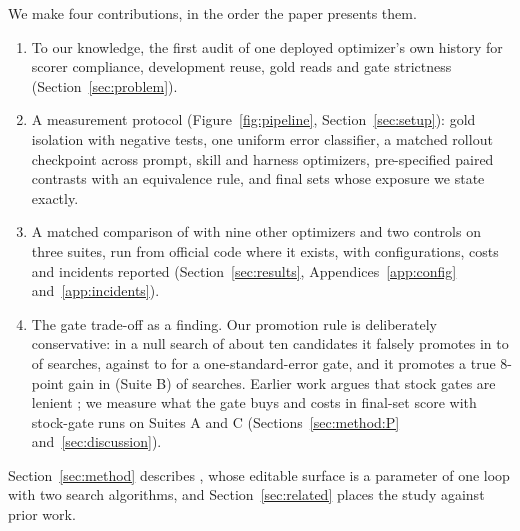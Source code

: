 We make four contributions, in the order the paper presents them.
\begin{enumerate}[leftmargin=*,nosep]
\item To our knowledge, the first audit of one deployed optimizer's own history for scorer compliance, development reuse, gold reads and gate strictness (Section~\ref{sec:problem}).
\item A measurement protocol (Figure~\ref{fig:pipeline}, Section~\ref{sec:setup}): gold isolation with negative tests, one uniform error classifier, a matched rollout checkpoint across prompt, skill and harness optimizers, pre-specified paired contrasts with an equivalence rule, and final sets whose exposure we state exactly.
\item A matched comparison of \capevolve{} with nine other optimizers and two controls on three suites, run from official code where it exists, with configurations, costs and incidents reported (Section~\ref{sec:results}, Appendices~\ref{app:config} and~\ref{app:incidents}). 
\item The gate trade-off as a finding. Our promotion rule is deliberately conservative: in a null search of about ten candidates it falsely promotes in \simPFalseB{} to \simPFalseC{} of searches, against \simKoneFalseB{} to \simKoneFalseA{} for a one-standard-error gate, and it promotes a true 8-point gain in \simPPowerEightB{} (Suite B) of searches. Earlier work argues that stock gates are lenient \citep{shawn2026pace}; we measure what the gate buys and costs in final-set score with stock-gate runs on Suites A and C (Sections~\ref{sec:method:P} and~\ref{sec:discussion}).
\end{enumerate}
Section~\ref{sec:method} describes \capevolve{}, whose editable surface is a parameter of one loop with two search algorithms, and Section~\ref{sec:related} places the study against prior work.
